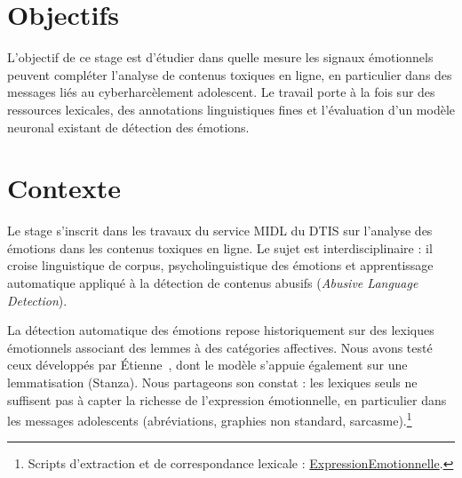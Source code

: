 









\maketitle


\section*{Objectifs}

L'objectif de ce stage est d'étudier dans quelle mesure les signaux émotionnels peuvent compléter l'analyse de contenus toxiques en ligne, en particulier dans des messages liés au cyberharcèlement adolescent. Le travail porte à la fois sur des ressources lexicales, des annotations linguistiques fines et l'évaluation d'un modèle neuronal existant de détection des émotions.

\section*{Contexte}

Le stage s'inscrit dans les travaux du service MIDL du DTIS sur l'analyse des émotions dans les contenus toxiques en ligne. Le sujet est interdisciplinaire : il croise linguistique de corpus, psycholinguistique des émotions et apprentissage automatique appliqué à la détection de contenus abusifs (\textit{Abusive Language Detection}).

La détection automatique des émotions repose historiquement sur des lexiques émotionnels associant des lemmes à des catégories affectives. Nous avons testé ceux développés par Étienne~\citep{etienne2023analyse}, dont le modèle s'appuie également sur une lemmatisation (Stanza). Nous partageons son constat : les lexiques seuls ne suffisent pas à capter la richesse de l'expression émotionnelle, en particulier dans les messages adolescents (abréviations, graphies non standard, sarcasme).\footnote{Scripts d'extraction et de correspondance lexicale : \href{https://github.com/GwenTsang/ExpressionEmotionnelle}{ExpressionEmotionnelle}.}

